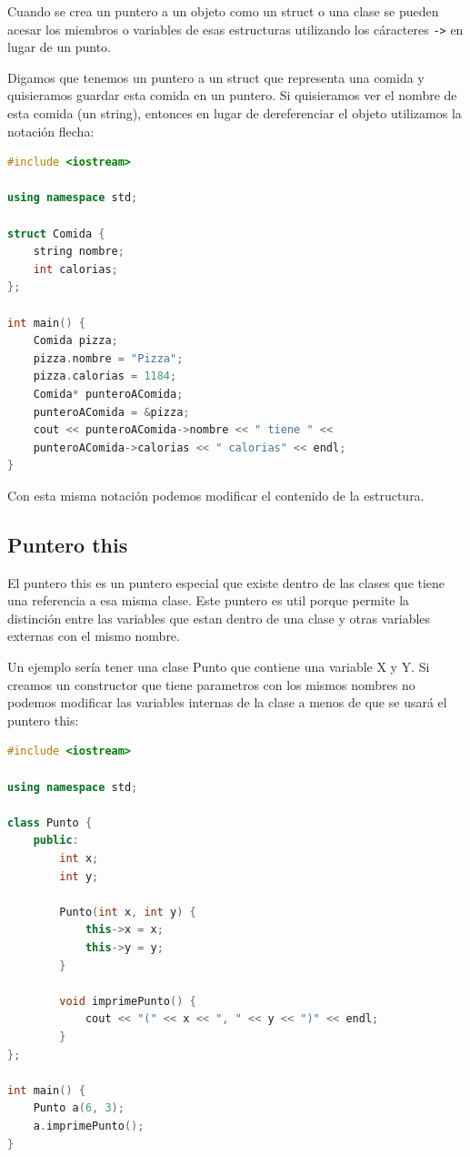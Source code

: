 \documentclass{article}
\begin{document}
Cuando se crea un puntero a un objeto como un struct o una clase se pueden acesar los miembros o variables de esas estructuras utilizando los cáracteres \lstinline{->} en lugar de un punto.

Digamos que tenemos un puntero a un struct que representa una comida y quisieramos guardar esta comida en un puntero. Si quisieramos ver el nombre de esta comida (un string), entonces en lugar de dereferenciar el objeto utilizamos la notación flecha:

\begin{lstlisting}[language=C++, title=Punteros a objetos]
#include <iostream>

using namespace std;

struct Comida {
	string nombre;
	int calorias;
};

int main() {
	Comida pizza;
	pizza.nombre = "Pizza";
	pizza.calorias = 1184;
	Comida* punteroAComida;
	punteroAComida = &pizza;
	cout << punteroAComida->nombre << " tiene " <<
	punteroAComida->calorias << " calorias" << endl;
}    
\end{lstlisting}

Con esta misma notación podemos modificar el contenido de la estructura.

\subsection{Puntero this}

El puntero this es un puntero especial que existe dentro de las clases que tiene una referencia a esa misma clase. Este puntero es util porque permite la distinción entre las variables que estan dentro de una clase y otras variables externas con el mismo nombre.

Un ejemplo sería tener una clase Punto que contiene una variable X y Y. Si creamos un constructor que tiene parametros con los mismos nombres no podemos modificar las variables internas de la clase a menos de que se usará el puntero this:

\begin{lstlisting}[language=C++, title=Puntero this]
#include <iostream>

using namespace std;

class Punto {
	public:
		int x;
		int y;

		Punto(int x, int y) {	
			this->x = x;
			this->y = y;
		}

		void imprimePunto() {
			cout << "(" << x << ", " << y << ")" << endl;
		}
};

int main() {
	Punto a(6, 3);
	a.imprimePunto();
}    
\end{lstlisting}
\end{document}
